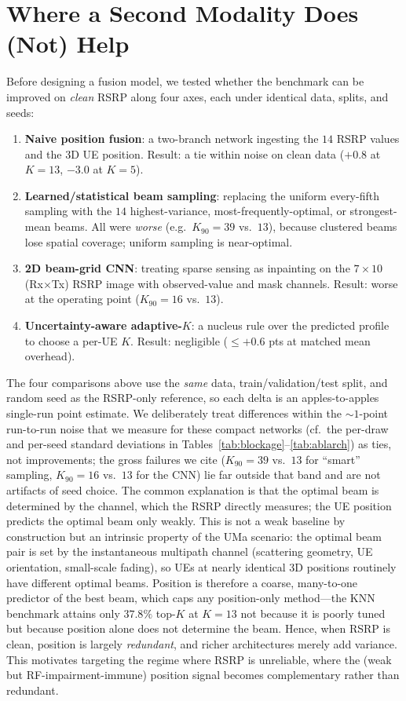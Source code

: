\documentclass[conference]{IEEEtran}
\begin{document}
\section{Where a Second Modality Does (Not) Help}\label{sec:negative}
Before designing a fusion model, we tested whether the benchmark can be improved
on \emph{clean} RSRP along four axes, each under identical data, splits, and
seeds:
\begin{enumerate}
\item \textbf{Naive position fusion}: a two-branch network ingesting the $14$
RSRP values and the 3D UE position. Result: a tie within noise on clean data
($+0.8$ at $K{=}13$, $-3.0$ at $K{=}5$).
\item \textbf{Learned/statistical beam sampling}: replacing the uniform
every-fifth sampling with the $14$ highest-variance, most-frequently-optimal, or
strongest-mean beams. All were \emph{worse} (e.g.\ $K_{90}{=}39$ vs.\ $13$),
because clustered beams lose spatial coverage; uniform sampling is near-optimal.
\item \textbf{2D beam-grid CNN}: treating sparse sensing as inpainting on the
$7\times10$ (Rx$\times$Tx) RSRP image with observed-value and mask channels.
Result: worse at the operating point ($K_{90}{=}16$ vs.\ $13$).
\item \textbf{Uncertainty-aware adaptive-$K$}: a nucleus rule over the predicted
profile to choose a per-UE $K$. Result: negligible ($\leq{+}0.6$ pts at matched
mean overhead).
\end{enumerate}
The four comparisons above use the \emph{same} data, train/validation/test split,
and random seed as the RSRP-only reference, so each delta is an apples-to-apples
single-run point estimate. We deliberately treat differences within the
$\sim$$1$-point run-to-run noise that we measure for these compact networks (cf.\
the per-draw and per-seed standard deviations in
Tables~\ref{tab:blockage}--\ref{tab:ablarch}) as ties, not improvements; the
gross failures we cite ($K_{90}{=}39$ vs.\ $13$ for ``smart'' sampling,
$K_{90}{=}16$ vs.\ $13$ for the CNN) lie far outside that band and are not
artifacts of seed choice.
The common explanation is that the optimal beam is determined by the channel,
which the RSRP directly measures; the UE position predicts the optimal beam only
weakly. This is not a weak baseline by construction but an intrinsic property of
the UMa scenario: the optimal beam pair is set by the instantaneous multipath
channel (scattering geometry, UE orientation, small-scale fading), so UEs at
nearly identical 3D positions routinely have different optimal beams. Position is
therefore a coarse, many-to-one predictor of the best beam, which caps any
position-only method---the KNN benchmark attains only $37.8\%$ top-$K$ at $K{=}13$
not because it is poorly tuned but because position alone does not determine the
beam. Hence, when RSRP is clean, position is largely \emph{redundant}, and richer
architectures merely add variance. This motivates targeting the regime where RSRP
is unreliable, where the (weak but RF-impairment-immune) position signal becomes
complementary rather than redundant.
\end{document}
